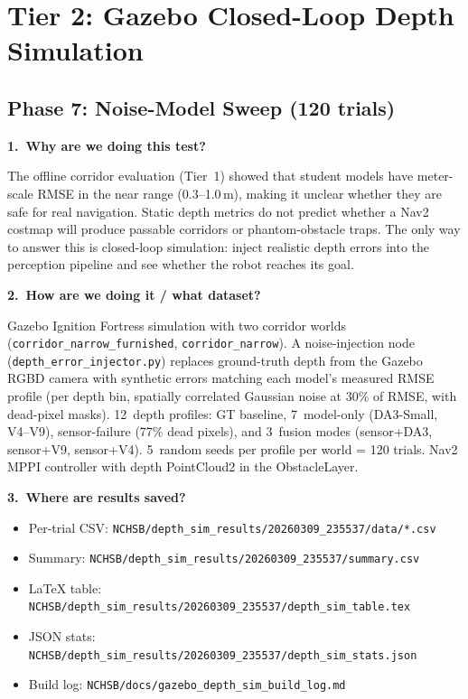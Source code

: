 \documentclass[11pt,a4paper]{article}
\begin{document}
\section*{Tier 2: Gazebo Closed-Loop Depth Simulation}

\subsection*{Phase 7: Noise-Model Sweep (120 trials)}

\textbf{1.\ Why are we doing this test?}

The offline corridor evaluation (Tier~1) showed that student models have
meter-scale RMSE in the near range (0.3--1.0\,m), making it unclear
whether they are safe for real navigation.  Static depth metrics do not
predict whether a Nav2 costmap will produce passable corridors or
phantom-obstacle traps.  The only way to answer this is closed-loop
simulation: inject realistic depth errors into the perception pipeline
and see whether the robot reaches its goal.

\textbf{2.\ How are we doing it / what dataset?}

Gazebo Ignition Fortress simulation with two corridor worlds
(\texttt{corridor\_narrow\_furnished}, \texttt{corridor\_narrow}).
A noise-injection node (\texttt{depth\_error\_injector.py}) replaces
ground-truth depth from the Gazebo RGBD camera with synthetic errors
matching each model's measured RMSE profile (per depth bin, spatially
correlated Gaussian noise at 30\% of RMSE, with dead-pixel masks).
12~depth profiles: GT baseline, 7~model-only (DA3-Small, V4--V9),
sensor-failure (77\% dead pixels), and 3~fusion modes
(sensor+DA3, sensor+V9, sensor+V4).
5~random seeds per profile per world = 120 trials.
Nav2 MPPI controller with depth PointCloud2 in the ObstacleLayer.

\textbf{3.\ Where are results saved?}

\begin{itemize}
  \item Per-trial CSV: \texttt{NCHSB/depth\_sim\_results/20260309\_235537/data/*.csv}
  \item Summary: \texttt{NCHSB/depth\_sim\_results/20260309\_235537/summary.csv}
  \item LaTeX table: \texttt{NCHSB/depth\_sim\_results/20260309\_235537/depth\_sim\_table.tex}
  \item JSON stats: \texttt{NCHSB/depth\_sim\_results/20260309\_235537/depth\_sim\_stats.json}
  \item Build log: \texttt{NCHSB/docs/gazebo\_depth\_sim\_build\_log.md}
\end{itemize}
\end{document}
